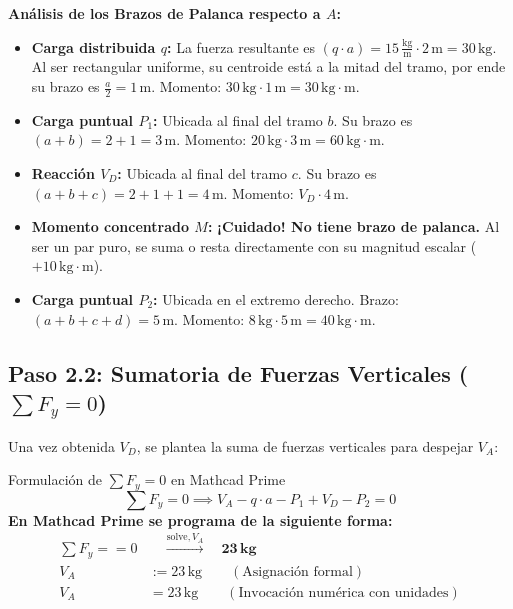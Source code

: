 \documentclass[10pt,a4paper]{article}
\begin{document}
\noindent \textbf{Análisis de los Brazos de Palanca respecto a $A$:}
\begin{itemize}[leftmargin=*,itemsep=1pt]
    \item \textbf{Carga distribuida $q$:} La fuerza resultante es $(q \cdot a) = 15\,\frac{\text{kg}}{\text{m}} \cdot 2\,\text{m} = 30\,\text{kg}$. Al ser rectangular uniforme, su centroide está a la mitad del tramo, por ende su brazo es $\frac{a}{2} = 1\,\text{m}$. Momento: $30\,\text{kg} \cdot 1\,\text{m} = 30\,\text{kg}\cdot\text{m}$.
    \item \textbf{Carga puntual $P_1$:} Ubicada al final del tramo $b$. Su brazo es $(a + b) = 2 + 1 = 3\,\text{m}$. Momento: $20\,\text{kg} \cdot 3\,\text{m} = 60\,\text{kg}\cdot\text{m}$.
    \item \textbf{Reacción $V_D$:} Ubicada al final del tramo $c$. Su brazo es $(a + b + c) = 2 + 1 + 1 = 4\,\text{m}$. Momento: $V_D \cdot 4\,\text{m}$.
    \item \textbf{Momento concentrado $M$:} \textbf{¡Cuidado! No tiene brazo de palanca.} Al ser un par puro, se suma o resta directamente con su magnitud escalar ($+10\,\text{kg}\cdot\text{m}$).
    \item \textbf{Carga puntual $P_2$:} Ubicada en el extremo derecho. Brazo: $(a+b+c+d) = 5\,\text{m}$. Momento: $8\,\text{kg} \cdot 5\,\text{m} = 40\,\text{kg}\cdot\text{m}$.
\end{itemize}

\subsection{Paso 2.2: Sumatoria de Fuerzas Verticales ($\sum F_y = 0$)}
Una vez obtenida $V_D$, se plantea la suma de fuerzas verticales para despejar $V_A$:

\begin{mathcadbox}{Formulación de $\sum F_y = 0$ en Mathcad Prime}
\begin{equation*}
    \sum F_y = 0 \implies V_A - q \cdot a - P_1 + V_D - P_2 = 0
\end{equation*}
\textbf{En Mathcad Prime se programa de la siguiente forma:}
\begin{align*}
    \sum F_y == 0 & \quad \xrightarrow{\text{solve}, V_A} \quad \mathbf{23\,\text{kg}} \\
    V_A &:= 23\,\text{kg} \qquad (\text{Asignación formal}) \\
    V_A &= 23\,\text{kg} \qquad (\text{Invocación numérica con unidades})
\end{align*}
\end{mathcadbox}
\end{document}
